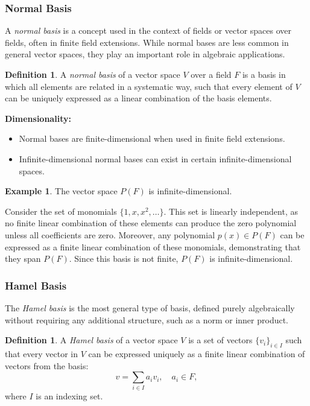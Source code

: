 \documentclass[12pt, reqno]{amsart}
\theoremstyle{definition}
\newtheorem{definition}[theorem]{Definition}
\newtheorem{example}[theorem]{Example}
\numberwithin{equation}{section}
\begin{document}
\subsubsection{Normal Basis} 
A \textit{normal basis} is a concept used in the context of fields or vector spaces over fields, often in finite field extensions. While normal bases are less common in general vector spaces, they play an important role in algebraic applications.

\begin{definition}
A \textit{normal basis} of a vector space \( V \) over a field \( F \) is a basis in which all elements are related in a systematic way, such that every element of \( V \) can be uniquely expressed as a linear combination of the basis elements.
\end{definition}

\noindent \textbf{Dimensionality:}
\begin{itemize}
    \item Normal bases are finite-dimensional when used in finite field extensions.
    \item Infinite-dimensional normal bases can exist in certain infinite-dimensional spaces.
\end{itemize}

\begin{example}
The vector space \( P(F) \) is infinite-dimensional. 

Consider the set of monomials \( \{1, x, x^2, \dots\} \). This set is linearly independent, as no finite linear combination of these elements can produce the zero polynomial unless all coefficients are zero. Moreover, any polynomial \( p(x) \in P(F) \) can be expressed as a finite linear combination of these monomials, demonstrating that they span \( P(F) \). Since this basis is not finite, \( P(F) \) is infinite-dimensional.
\end{example}

\subsubsection{Hamel Basis}
The \textit{Hamel basis} is the most general type of basis, defined purely algebraically without requiring any additional structure, such as a norm or inner product.
\vfill
\begin{definition}
A \textit{Hamel basis} of a vector space $V$ is a set of vectors $\{v_i\}_{i \in I}$ such that every vector in $V$ can be expressed uniquely as a finite linear combination of vectors from the basis:
$$
v = \sum_{i \in I} a_i v_i, \quad a_i \in F,
$$
where $I$ is an indexing set.
\end{definition}
\end{document}
